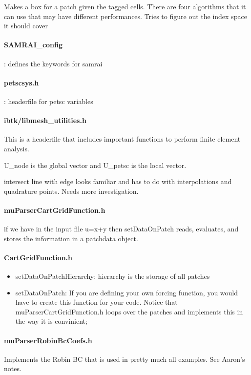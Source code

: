 \documentclass[12pt,a4paper,twoside]{article}
\begin{document}
Makes a box for a patch given the tagged cells. There are four algorithms that it can use that may have different performances. 
Tries to figure out the index space it should cover
\paragraph{SAMRAI\_config}: defines the keywords for samrai
\paragraph{petscsys.h}: headerfile for petsc variables


\paragraph{ibtk/libmesh\_utilities.h}
This is a headerfile that includes important functions to perform finite element analysis. 

U\_node is the global vector and U\_petsc is the local vector. 

{\color{red} intersect line with edge} looks familiar and has to do with interpolations and quadrature points. Needs more investigation.


\paragraph{muParserCartGridFunction.h}
 if we have in the input file u=x+y then  setDataOnPatch reads, evaluates,  and stores the information in a patchdata object.

\paragraph{CartGridFunction.h}
\begin{itemize}
    \item setDataOnPatchHierarchy:  hierarchy is the storage of all patches
    \item setDataOnPatch:  If you are defining your own forcing function, you would have to create this function for your code. Notice that muParserCartGridFunction.h  loops over the patches and implements this in the way it is convinient;
\end{itemize}

\paragraph{muParserRobinBcCoefs.h}
Implements the Robin BC that is used in pretty much all examples. See Aaron's notes. 
\end{document}
